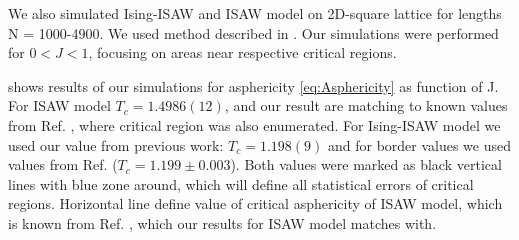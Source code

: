 \documentclass[a4paper]{jpconf}
\begin{document}

We also simulated Ising-ISAW and ISAW model on 2D-square lattice for lengths N = 1000-4900.  
We used method described in \cite{faizullina2021critical}. 
Our simulations were performed for $0 < J < 1$, focusing on areas near respective critical regions.

 shows results of our simulations for asphericity \eqref{eq:Asphericity} as function of J. 
For ISAW model $T_{c} = 1.4986(12)$, and our result are matching to known values from  Ref. \cite{Caracciolo2011}, where critical region was also enumerated.
For Ising-ISAW model we used our value from previous work: $T_{c} = 1.198(9)$ \cite{faizullina2021critical} and for border values we used values from Ref.\cite{Foster2021} ($T_{c} = 1.199 \pm 0.003$). 
Both values were marked as black vertical lines with blue zone around, which will define all statistical errors of critical regions. 
Horizontal line define value of critical asphericity of ISAW model, which is known from Ref. \cite{Caracciolo2011}, which our results for ISAW model matches with.
\end{document}
